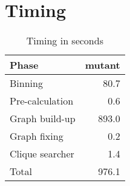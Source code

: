 \section{Timing}\label{sec:time}

\begin{table}
	\caption{Timing in seconds}
	\label{tab:time}
	\centering
	\begin{tabular}{lr}
		\toprule
		\textbf{Phase} & \textbf{mutant} \\
		\midrule
		Binning & \num{80.7} \\
		Pre-calculation & \num{0.6} \\
		Graph build-up & \num{893.0} \\
		Graph fixing & \num{0.2} \\
		Clique searcher & \num{1.4} \\
		\midrule
		Total & \num{976.1} \\
		\bottomrule
	\end{tabular}
\end{table}
